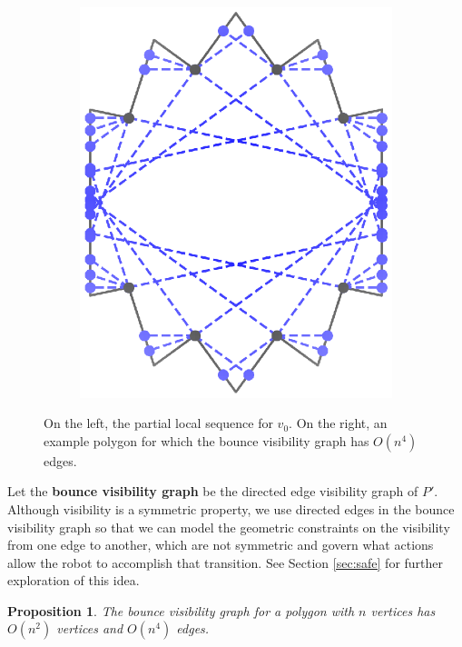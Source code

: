 \documentclass[sageh,times,Review]{sagej}
\newtheorem{proposition}{Proposition}
\begin{document}
\begin{figure}[h]
\begin{subfigure}{0.5\columnwidth}
    \includegraphics[width=\linewidth]{chestnut_5.eps}
\end{subfigure}
\centering
\caption{On the left, the partial local sequence for $v_0$. On the right, an example polygon for which the bounce visibility graph has
$O(n^4)$ edges.\label{fig:alg1}}
\end{figure}

Let the \textbf{bounce visibility graph} be the directed edge visibility graph of
$P'$. Although visibility is a symmetric property, we use directed edges in the
bounce visibility graph so that 
we can model the 
geometric constraints on the visibility from one edge to another, which are
not symmetric and govern what actions allow the robot to accomplish that
transition. See Section \ref{sec:safe} for further exploration of this idea.



\begin{proposition} \label{prop:complexity}
The bounce visibility graph for a polygon with $n$ vertices has 
$O(n^2)$ vertices and $O(n^4)$ edges.
\end{proposition}
\end{document}
